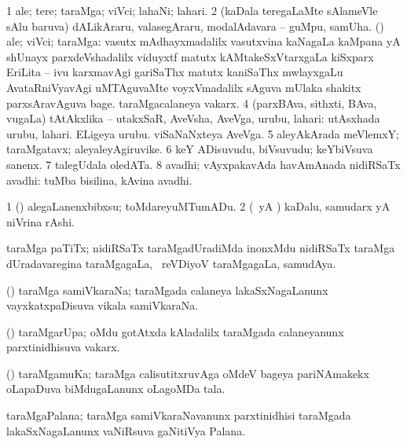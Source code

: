 \bentry
{} 
\gl{\nA}
\expl{}
\bmng
\bnum
\num{1} ale; tere; taraMga; viVci; lahaNi; lahari. 
\num{2} (kaDala teregaLaMte sAlameVle sAlu baruva) dALikAraru, valasegAraru, modalAdavara -- guMpu, samUha. 
 (\Bwvi) ale; viVci; taraMga: 
\banum
{} vasutx mAdhayxmadalilx vasutxvina kaNagaLa kaMpana yA shUnayx parxdeVshadalilx viduyxtf matutx kAMtakeSxVtarxgaLa kiSxparx EriLita -- ivu karxmavAgi gariSaThx matutx kaniSaThx mwlayxgaLu AvataRniVyavAgi uMTAguvaMte voyxVmadalilx sAguva mUlaka shakitx parxsAravAguva bage. 
 taraMgacalaneya vakarx. 
\eanum
\numie
\num{4} (parxBAva, sithxti, BAva, \mo vugaLa) tAtAkxlika -- utakxSaR, AveVsha, AveVga, urubu, lahari:  utAsxhada urubu, lahari.  ELigeya urubu.  viSaNaNxteya AveVga. 
\num{5} aleyAkArada meVlemxY; taraMgatavx; aleyaleyAgiruvike. 
\num{6} keY ADisuvudu, biVsuvudu; keYbiVsuva sanenx. 
\num{7} talegUdala oledATa. 
\num{8} avadhi; vAyxpakavAda havAmAnada nidiRSaTx avadhi:  tuMba bisilina, kAvina avadhi. 
\enum
\emng

\noindent 
\gl{\pagu}
\expl{}
\bmng
\bnum
\num{1}  (\AmA) alegaLanenxbibxsu; toMdareyuMTumADu. 
\num{2}  (\kAparx\ yA \alaMshA) kaDalu, samudarx yA niVrina rAshi. 
\enum
\emng
\eentry

\bentry
{} 
\gl{\nA}
\expl{}
\bmng
taraMga paTiTx; nidiRSaTx taraMgadUradiMda inonxMdu nidiRSaTx taraMga dUradavaregina taraMgagaLa, \kanmu\ reVDiyoV taraMgagaLa, samudAya. 
\emng
\eentry

\bentry
{} 
\gl{\nA}
\expl{}
\bmng
(\Bwvi) taraMga samiVkaraNa; taraMgada calaneya lakaSxNagaLanunx vayxkatxpaDisuva vikala  samiVkaraNa. 
\emng
\eentry

\bentry
{} 
\gl{\nA}
\expl{}
\bmng
(\Bwvi) taraMgarUpa; oMdu gotAtxda kAladalilx taraMgada calaneyanunx parxtinidhisuva vakarx. 
\emng
\eentry

\bentry
{} 
\gl{\nA}
\expl{}
\bmng
(\Bwvi) taraMgamuKa; taraMga calisutitxruvAga oMdeV bageya pariNAmakekx oLapaDuva biMdugaLanunx oLagoMDa tala. 
\emng
\eentry

\bentry
{} 
\gl{\nA}
\expl{}
\bmng
taraMgaPalana; taraMga samiVkaraNavanunx parxtinidhisi taraMgada lakaSxNagaLanunx vaNiRsuva gaNitiVya Palana. 
\emng
\eentry

